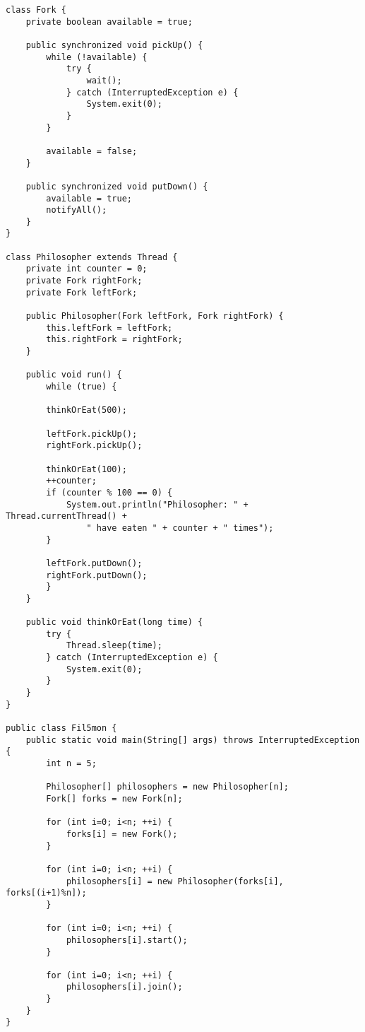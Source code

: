 \documentclass{article}
\begin{document}
\begin{verbatim}
class Fork {
    private boolean available = true;

    public synchronized void pickUp() {
        while (!available) {
            try {
                wait();
            } catch (InterruptedException e) {
                System.exit(0);
            }
        }
        
        available = false;
    }
    
    public synchronized void putDown() {
        available = true;
        notifyAll();
    }
}
    
class Philosopher extends Thread {
    private int counter = 0;
    private Fork rightFork;
    private Fork leftFork;

    public Philosopher(Fork leftFork, Fork rightFork) {
        this.leftFork = leftFork;
        this.rightFork = rightFork;
    }
    
    public void run() {
        while (true) {

        thinkOrEat(500);
    
        leftFork.pickUp();
        rightFork.pickUp();

        thinkOrEat(100);
        ++counter;
        if (counter % 100 == 0) {
            System.out.println("Philosopher: " + Thread.currentThread() + 
                " have eaten " + counter + " times");
        }

        leftFork.putDown();
        rightFork.putDown();
        }
    }

    public void thinkOrEat(long time) {
        try {
            Thread.sleep(time);
        } catch (InterruptedException e) {
            System.exit(0);
        }
    }
}
    
public class Fil5mon {
    public static void main(String[] args) throws InterruptedException {
        int n = 5;

        Philosopher[] philosophers = new Philosopher[n];
        Fork[] forks = new Fork[n];

        for (int i=0; i<n; ++i) {
            forks[i] = new Fork();
        }

        for (int i=0; i<n; ++i) {
            philosophers[i] = new Philosopher(forks[i], forks[(i+1)%n]);
        }

        for (int i=0; i<n; ++i) {
            philosophers[i].start();
        }

        for (int i=0; i<n; ++i) {
            philosophers[i].join();
        }
    }
}
\end{verbatim}
\end{document}
